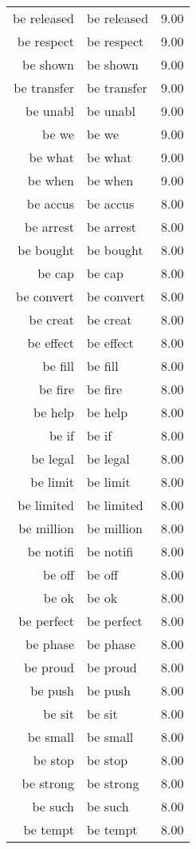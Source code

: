 \begin{table}[ht]
\begin{tabular}{rlr}
  be released & be released & 9.00 \\ 
  be respect & be respect & 9.00 \\ 
  be shown & be shown & 9.00 \\ 
  be transfer & be transfer & 9.00 \\ 
  be unabl & be unabl & 9.00 \\ 
  be we & be we & 9.00 \\ 
  be what & be what & 9.00 \\ 
  be when & be when & 9.00 \\ 
  be accus & be accus & 8.00 \\ 
  be arrest & be arrest & 8.00 \\ 
  be bought & be bought & 8.00 \\ 
  be cap & be cap & 8.00 \\ 
  be convert & be convert & 8.00 \\ 
  be creat & be creat & 8.00 \\ 
  be effect & be effect & 8.00 \\ 
  be fill & be fill & 8.00 \\ 
  be fire & be fire & 8.00 \\ 
  be help & be help & 8.00 \\ 
  be if & be if & 8.00 \\ 
  be legal & be legal & 8.00 \\ 
  be limit & be limit & 8.00 \\ 
  be limited & be limited & 8.00 \\ 
  be million & be million & 8.00 \\ 
  be notifi & be notifi & 8.00 \\ 
  be off & be off & 8.00 \\ 
  be ok & be ok & 8.00 \\ 
  be perfect & be perfect & 8.00 \\ 
  be phase & be phase & 8.00 \\ 
  be proud & be proud & 8.00 \\ 
  be push & be push & 8.00 \\ 
  be sit & be sit & 8.00 \\ 
  be small & be small & 8.00 \\ 
  be stop & be stop & 8.00 \\ 
  be strong & be strong & 8.00 \\ 
  be such & be such & 8.00 \\ 
  be tempt & be tempt & 8.00 \\ 

\end{tabular}
\end{table}

